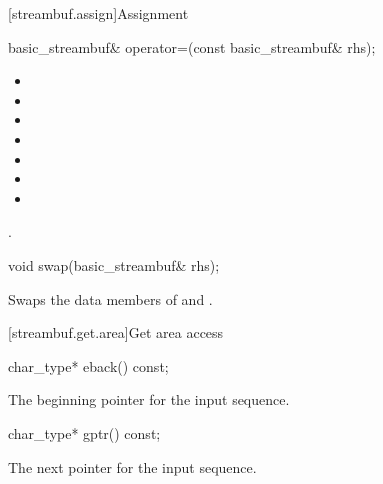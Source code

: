 [streambuf.assign]{Assignment}

%
\begin{itemdecl}
basic_streambuf& operator=(const basic_streambuf& rhs);
\end{itemdecl}

\begin{itemdescr}
\pnum
\ensures
\begin{itemize}
\item {}
\item {}
\item {}
\item {}
\item {}
\item {}
\item {}
\end{itemize}

\pnum
\returns
{}.
\end{itemdescr}

%
\begin{itemdecl}
void swap(basic_streambuf& rhs);
\end{itemdecl}

\begin{itemdescr}
\pnum
\effects
Swaps the data members of 
and .
\end{itemdescr}

[streambuf.get.area]{Get area access}

%
\begin{itemdecl}
char_type* eback() const;
\end{itemdecl}

\begin{itemdescr}
\pnum
\returns
The beginning pointer for the input sequence.
\end{itemdescr}

%
\begin{itemdecl}
char_type* gptr() const;
\end{itemdecl}

\begin{itemdescr}
\pnum
\returns
The next pointer for the input sequence.
\end{itemdescr}

